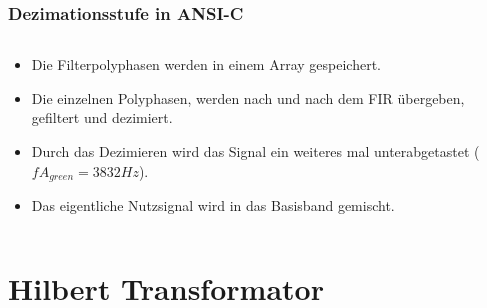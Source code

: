 \documentclass{beamer}
\begin{document}
\begin{frame}[fragile]
  \frametitle{Dezimationsstufe in ANSI-C}
  \begin{columns}
    \begin{column}{0.7\textwidth}
      \begin{itemize}
        \item Die Filterpolyphasen werden in einem Array gespeichert.
        \item Die einzelnen Polyphasen, werden nach und nach dem FIR übergeben, gefiltert und dezimiert. 
        \item Durch das Dezimieren wird das Signal ein weiteres mal unterabgetastet ($fA_{green} = 3832Hz$).
        \item Das eigentliche Nutzsignal wird in das Basisband gemischt.
      \end{itemize}
    \end{column}
    \begin{column}{0.7\textwidth}

    \end{column}
  \end{columns}
  
\end{frame}

\section{Hilbert Transformator}
\end{document}
